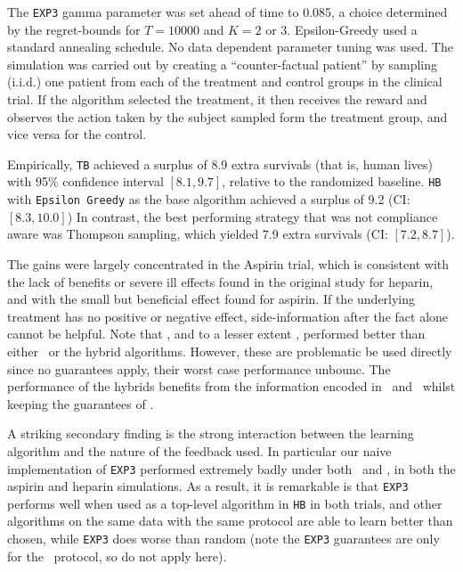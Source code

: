 The \texttt{EXP3} gamma parameter was set ahead of time to 0.085, a choice determined by the regret-bounds for $T=10000$ and $K=2$ or $3$. Epsilon-Greedy used a standard annealing schedule. No data dependent parameter tuning was used.
The simulation was carried out by creating a ``counter-factual patient'' by sampling (i.i.d.) one patient from each of the treatment and control groups in the clinical trial. If the algorithm selected the treatment, it then receives the reward and observes the action taken by the subject sampled form the treatment group, and vice versa for the control.


Empirically, \texttt{TB} achieved a surplus of 8.9 extra survivals (that is, human lives) with 95\% confidence interval $[8.1,9.7]$, relative to the randomized baseline.
\texttt{HB} with \texttt{Epsilon Greedy} as the base algorithm achieved a surplus of 9.2 (CI: $[8.3,10.0]$)
In contrast, the best performing strategy that was not compliance aware was Thompson sampling, which yielded 7.9 extra survivals (CI: $[7.2,8.7]$). 

The gains were largely concentrated in the Aspirin trial, which is consistent with the lack of benefits or severe ill effects found in the original study \cite{ist:97} for heparin, and with the small but beneficial effect found for aspirin. 
If the underlying treatment has no positive or negative effect, side-information after the fact alone cannot be helpful.
Note that \actual, and to a lesser extent \comply, performed better than either \chosen\, or the hybrid algorithms. However, these are problematic be used directly since no guarantees apply, their worst case performance unbounc. The performance of the hybrids benefits from the information encoded in \actual\, and \comply\, whilst keeping the guarantees of \chosen. 


A striking secondary finding is the strong interaction between the learning algorithm and the nature of the feedback used. In particular our naive implementation of \texttt{EXP3} performed extremely badly under both \actual\, and \comply, in both the aspirin and heparin simulations. As a result, it is remarkable is that \texttt{EXP3} performs well when used as a top-level algorithm in \texttt{HB} in both trials, and other algorithms on the same data with the same protocol are able to learn better than chosen, while \texttt{EXP3} does worse than random (note the \texttt{EXP3} guarantees are only for the \chosen\, protocol, so do not apply here).




